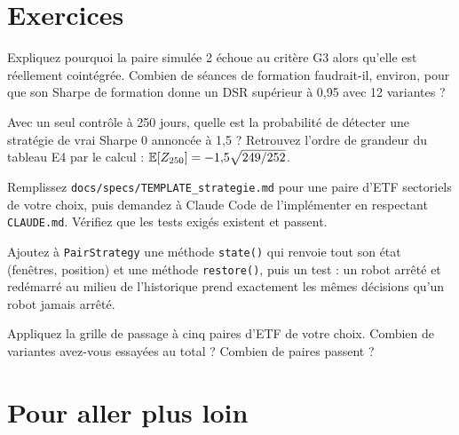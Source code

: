 \section{Exercices}

\begin{exercise}
Expliquez pourquoi la paire simulée 2 échoue au critère G3 alors qu'elle est réellement cointégrée. Combien de séances de formation faudrait-il, environ, pour que son Sharpe de formation donne un DSR supérieur à 0,95 avec 12 variantes ?
\end{exercise}

\begin{exercise}
Avec un seul contrôle à 250 jours, quelle est la probabilité de détecter une stratégie de vrai Sharpe 0 annoncée à 1,5 ? Retrouvez l'ordre de grandeur du tableau E4 par le calcul : $\mathbb{E}[Z_{250}] = -1{,}5\sqrt{249/252}$.
\end{exercise}

\begin{exercise}[à coder]
Remplissez \texttt{docs/specs/TEMPLATE\_strategie.md} pour une paire d'ETF sectoriels de votre choix, puis demandez à Claude Code de l'implémenter en respectant \texttt{CLAUDE.md}. Vérifiez que les tests exigés existent et passent.
\end{exercise}

\begin{exercise}[à coder]
Ajoutez à \texttt{PairStrategy} une méthode \texttt{state()} qui renvoie tout son état (fenêtres, position) et une méthode \texttt{restore()}, puis un test : un robot arrêté et redémarré au milieu de l'historique prend exactement les mêmes décisions qu'un robot jamais arrêté.
\end{exercise}

\begin{exercise}
Appliquez la grille de passage à cinq paires d'ETF de votre choix. Combien de variantes avez-vous essayées au total ? Combien de paires passent ?
\end{exercise}

\section{Pour aller plus loin}

